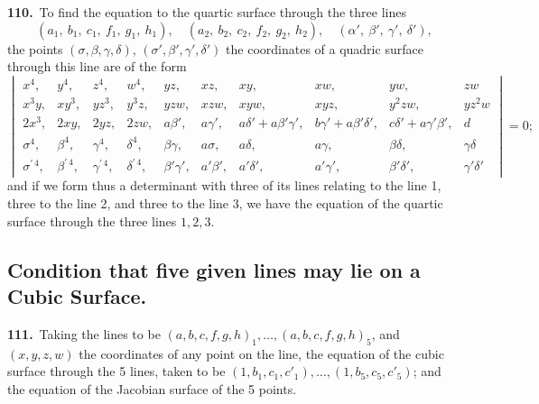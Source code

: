 \documentclass[11pt,a4paper]{article}
\begin{document}
\noindent\textbf{110.}\ To find the equation to the quartic surface through the three lines
\[
(a_1,\ b_1,\ c_1,\ f_1,\ g_1,\ h_1),\quad (a_2,\ b_2,\ c_2,\ f_2,\ g_2,\ h_2),\quad (\alpha',\ \beta',\ \gamma',\ \delta'),
\]
the points $(\sigma, \beta, \gamma, \delta)$, $(\sigma', \beta', \gamma', \delta')$ the coordinates of a quadric surface through this line are of the form
\[
\renewcommand{\arraystretch}{1.3}
\begin{vmatrix}
x^4, & y^4, & z^4, & w^4, & yz, & xz, & xy, & xw, & yw, & zw \\
x^3y, & xy^3, & yz^3, & y^3z, & yzw, & xzw, & xyw, & xyz, & y^2zw, & yz^2w\\
2x^3, & 2xy, & 2yz, & 2zw, & a\beta', & a\gamma', & a\delta'+a\beta'\gamma', & b\gamma'+ a\beta'\delta', & c\delta'+ a\gamma'\beta', & d\\
\sigma^4, & \beta^4, & \gamma^4, & \delta^4, & \beta\gamma, & a\sigma, & a\delta, & a\gamma, & \beta\delta, & \gamma\delta\\
\sigma^{\prime\,4}, & \beta^{\prime\,4}, & \gamma^{\prime\,4}, & \delta^{\prime\,4}, & \beta'\gamma', & a'\beta', & a'\delta', & a'\gamma', & \beta'\delta', & \gamma'\delta'
\end{vmatrix} = 0;
\]
and if we form thus a determinant with three of its lines relating to the line 1, three to the line 2, and three to the line 3, we have the equation of the quartic surface through the three lines $1, 2, 3$.

\subsection*{Condition that five given lines may lie on a Cubic Surface.}

\noindent\textbf{111.}\ Taking the lines to be $(a, b, c, f, g, h)_1, \ldots, (a, b, c, f, g, h)_5$, and $(x, y, z, w)$ the coordinates of any point on the line, the equation of the cubic surface through the 5 lines, taken to be $(1, b_1, c_1, c'_1), \ldots, (1, b_5, c_5, c'_5)$; and the equation of the Jacobian surface of the 5 points.

\newpage
\setcounter{page}{178}
\end{document}
